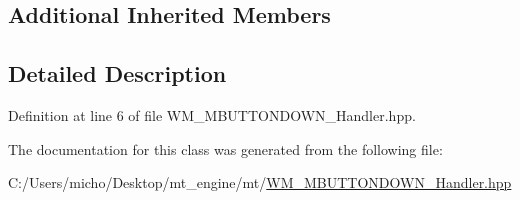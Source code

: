 \subsection*{Additional Inherited Members}


\subsection{Detailed Description}


Definition at line 6 of file W\+M\+\_\+\+M\+B\+U\+T\+T\+O\+N\+D\+O\+W\+N\+\_\+\+Handler.\+hpp.



The documentation for this class was generated from the following file\+:\begin{DoxyCompactItemize}
\item 
C\+:/\+Users/micho/\+Desktop/mt\+\_\+engine/mt/\hyperlink{_w_m___m_b_u_t_t_o_n_d_o_w_n___handler_8hpp}{W\+M\+\_\+\+M\+B\+U\+T\+T\+O\+N\+D\+O\+W\+N\+\_\+\+Handler.\+hpp}\end{DoxyCompactItemize}
